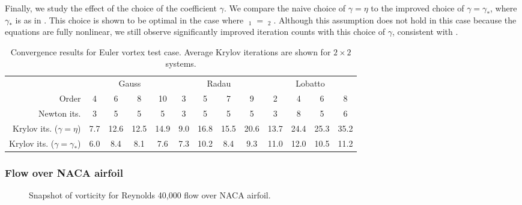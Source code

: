 \documentclass[review]{siamart}
\DeclareMathOperator{\cL}{\widehat{\mathcal{L}}}
\begin{document}
Finally, we study the effect of the choice of the coefficient $\gamma$.
We compare the naive choice of $\gamma = \eta$ to the improved choice of $\gamma = \gamma_*$, where $\gamma_*$ is as in .
This choice is shown to be optimal in the case where $\cL_1 = \cL_2$.
Although this assumption does not hold in this case because the equations are fully nonlinear, we still observe significantly improved iteration counts with this choice of $\gamma$, consistent
with .
{
\renewcommand{\tabcolsep}{4pt}
\begin{table}
	\centering
	\caption{Convergence results for Euler vortex test case. Average Krylov iterations are shown for $2 \times 2$ systems.}
	\begin{tabular}{r|cccc|cccc|cccc}
		\toprule
		& \multicolumn{4}{c}{Gauss} & \multicolumn{4}{c}{Radau} & \multicolumn{4}{c}{Lobatto}\\
		Order & 4 & 6 & 8 & 10 & 3 & 5 & 7 & 9 & 2 & 4 & 6 & 8 \\
		\midrule
		Newton its. & 3 & 5 & 5 & 5 & 3 & 5 & 5 & 5 & 3 & 8 & 5 & 6 \\
		\midrule
		\makecell[r]{Krylov its.\\($\gamma = \eta$)}
		& 7.7 & 12.6 & 12.5 & 14.9 & 9.0 & 16.8 & 15.5 & 20.6 & 13.7 & 24.4 & 25.3 & 35.2 \\[12pt]
		\makecell[r]{Krylov its.\\($\gamma = \gamma_*$)}
		& 6.0 & 8.4 & 8.1 & 7.6 & 7.3 & 10.2 & 8.4 & 9.3 & 11.0 & 12.0 & 10.5 & 11.2 \\
		\bottomrule
	\end{tabular}
\end{table}
}

\subsubsection{Flow over NACA airfoil}

\begin{figure}
	\centering
	\setlength{\fboxsep}{0pt}
	\caption{Snapshot of vorticity for Reynolds 40{,}000 flow over NACA airfoil.}
\end{figure}
\end{document}
